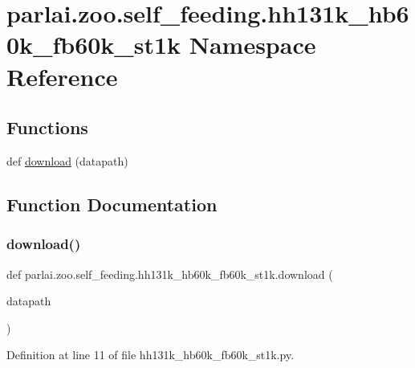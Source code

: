 \hypertarget{namespaceparlai_1_1zoo_1_1self__feeding_1_1hh131k__hb60k__fb60k__st1k}{}\section{parlai.\+zoo.\+self\+\_\+feeding.\+hh131k\+\_\+hb60k\+\_\+fb60k\+\_\+st1k Namespace Reference}
\label{namespaceparlai_1_1zoo_1_1self__feeding_1_1hh131k__hb60k__fb60k__st1k}
\subsection*{Functions}
\begin{DoxyCompactItemize}
\item 
def \hyperlink{namespaceparlai_1_1zoo_1_1self__feeding_1_1hh131k__hb60k__fb60k__st1k_a5e051a30e8d35df6f02340333024100b}{download} (datapath)
\end{DoxyCompactItemize}


\subsection{Function Documentation}
\mbox{\label{namespaceparlai_1_1zoo_1_1self__feeding_1_1hh131k__hb60k__fb60k__st1k_a5e051a30e8d35df6f02340333024100b}} 
\subsubsection{\texorpdfstring{download()}{download()}}
{\footnotesize\ttfamily def parlai.\+zoo.\+self\+\_\+feeding.\+hh131k\+\_\+hb60k\+\_\+fb60k\+\_\+st1k.\+download (\begin{DoxyParamCaption}\item[{}]{datapath }\end{DoxyParamCaption})}



Definition at line 11 of file hh131k\+\_\+hb60k\+\_\+fb60k\+\_\+st1k.\+py.



